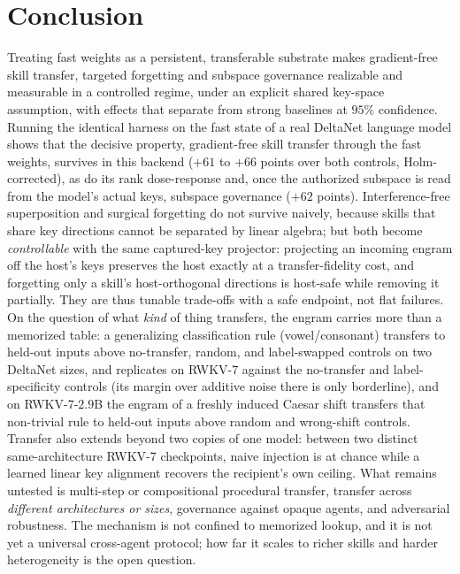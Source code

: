 \documentclass[11pt]{article}
\theoremstyle{definition}
\begin{document}
\section{Conclusion}

Treating fast weights as a persistent, transferable substrate makes gradient-free skill transfer, targeted forgetting and subspace governance realizable and measurable in a controlled regime, under an explicit shared key-space assumption, with effects that separate from strong baselines at $95\%$ confidence. Running the identical harness on the fast state of a real DeltaNet language model shows that the decisive property, gradient-free skill transfer through the fast weights, survives in this backend ($+61$ to $+66$ points over both controls, Holm-corrected), as do its rank dose-response and, once the authorized subspace is read from the model's actual keys, subspace governance ($+62$ points). Interference-free superposition and surgical forgetting do not survive naively, because skills that share key directions cannot be separated by linear algebra; but both become \emph{controllable} with the same captured-key projector: projecting an incoming engram off the host's keys preserves the host exactly at a transfer-fidelity cost, and forgetting only a skill's host-orthogonal directions is host-safe while removing it partially. They are thus tunable trade-offs with a safe endpoint, not flat failures. On the question of what \emph{kind} of thing transfers, the engram carries more than a memorized table: a generalizing classification rule (vowel/consonant) transfers to held-out inputs above no-transfer, random, and label-swapped controls on two DeltaNet sizes, and replicates on RWKV-7 against the no-transfer and label-specificity controls (its margin over additive noise there is only borderline), and on RWKV-7-$2.9$B the engram of a freshly induced Caesar shift transfers that non-trivial rule to held-out inputs above random and wrong-shift controls. Transfer also extends beyond two copies of one model: between two distinct same-architecture RWKV-7 checkpoints, naive injection is at chance while a learned linear key alignment recovers the recipient's own ceiling. What remains untested is multi-step or compositional procedural transfer, transfer across \emph{different architectures or sizes}, governance against opaque agents, and adversarial robustness. The mechanism is not confined to memorized lookup, and it is not yet a universal cross-agent protocol; how far it scales to richer skills and harder heterogeneity is the open question.
\end{document}
